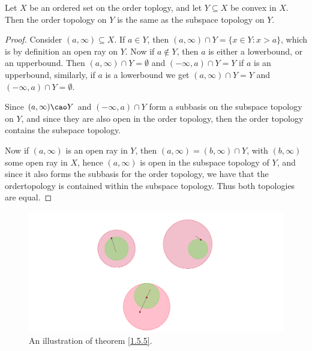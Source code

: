 \begin{theorem}\label{1.5.5}
    Let $X$ be an ordered set on the order toplogy, and let  $Y \subseteq X$ be convex in  $X$.
    Then the order topology on  $Y$ is the same as the subspace topology on  $Y$.
\end{theorem}
\begin{proof}
    Consider $(a, \infty) \subseteq X$. If  $a \in Y$, then  $(a,\infty) \cap Y=\{x \in Y: x>a\}$,
    which is by definition an open ray on $Y$. Now if  $a \notin Y$, then  $a$ is either a lowerbound, or
    an upperbound. Then  $(a, \infty) \cap Y=\emptyset$ and  $(-\infty,a) \cap Y=Y$ if  $a$ is an
    upperbound, similarly, if  $a$ is a lowerbound we get  $(a, \infty) \cap Y=Y$ and  $(-\infty,a) \cap Y=\emptyset$.

    Since $(a, \infty) \cao Y$ and  $(-\infty,a) \cap Y$ form a subbasis on the subspace topology on  $Y$,
    and since they are also open in  the order topology, then the order topology contains the subspace topology.

    Now if  $(a, \infty)$ is an open ray in  $Y$, then  $(a,\infty)=(b,\infty) \cap Y$, with $(b, \infty)$
    some open ray in  $X$, hence  $(a, \infty)$ is open in the subspace topology of  $Y$, and since
    it also forms the subbasis for the order topology, we have that the ordertopology is contained within the subspace
    topology. Thus both topologies are equal.
\end{proof}

\begin{figure}[h]
    \centering
    \includegraphics[scale = 0.2]{Figures/Chapter1/upperAndLowerBoundsOfDomains.png}
    \caption{An illustration of theorem \ref{1.5.5}.}
    \label{fig1.7}
\end{figure}

